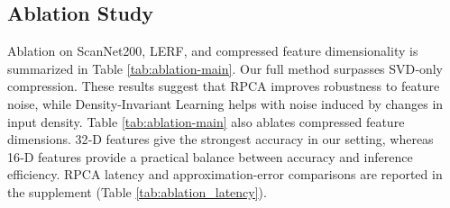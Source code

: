 \documentclass{article}
\begin{document}
\subsection{Ablation Study}
Ablation on ScanNet200, LERF, and compressed feature dimensionality is summarized in Table \ref{tab:ablation-main}. Our full method surpasses SVD‑only compression. These results suggest that RPCA improves robustness to feature noise, while Density‑Invariant Learning helps with noise induced by changes in input density.
Table \ref{tab:ablation-main} also ablates compressed feature dimensions. 32‑D features give the strongest accuracy in our setting, whereas 16‑D features provide a practical balance between accuracy and inference efficiency.
RPCA latency and approximation-error comparisons are reported in the supplement (Table \ref{tab:ablation_latency}).
\begin{table}[htbp]
    \centering
    \caption{Ablation study on module design and compressed feature dimensions. Left: component ablation on ScanNet200 and LERF using 16-dim features. Right: accuracy--latency trade-off with varying feature dimensions on LERF.}
    \label{tab:ablation-main}
    \centering
\end{table}
\vspace{-2.0em}
\end{document}
